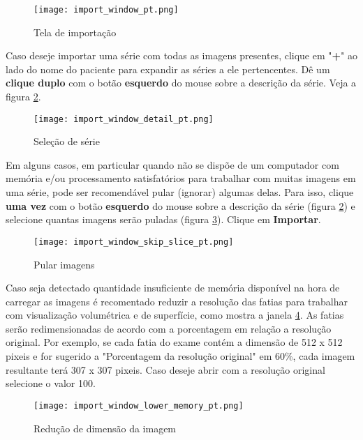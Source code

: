 \begin{figure}[!htb]
\centering
\texttt{[image: import\_window\_pt.png]}
\caption{Tela de importação}
\label{fig:win_import}
\end{figure}

\newpage

Caso deseje importar uma série com todas as imagens presentes, clique em "\textbf{+}" ao
lado do nome do paciente para expandir as séries a ele pertencentes. Dê um \textbf{clique duplo}
com o botão \textbf{esquerdo} do mouse sobre a descrição da série. Veja a figura
\ref{fig:import_serie}.

\begin{figure}[!htb]
\centering
\texttt{[image: import\_window\_detail\_pt.png]}
\caption{Seleção de série}
\label{fig:import_serie}
\end{figure}
 

Em alguns casos, em particular quando não se dispõe de um computador com memória e/ou
processamento satisfatórios para trabalhar com muitas imagens em uma série, pode ser
recomendável pular (ignorar) algumas delas. Para isso, clique \textbf{uma vez} com o botão
\textbf{esquerdo} do mouse sobre a descrição da série (figura \ref{fig:import_serie}) e selecione
quantas imagens serão puladas (figura \ref{fig:skip_image}). Clique em \textbf{Importar}.

\begin{figure}[!htb]
\centering
\texttt{[image: import\_window\_skip\_slice\_pt.png]}
\caption{Pular imagens}
\label{fig:skip_image}
\end{figure}


Caso seja detectado quantidade insuficiente de memória disponível na hora de carregar as imagens é recomentado 
reduzir a resolução das fatias para trabalhar com visualização volumétrica e de superfície, como mostra a janela \ref{fig:resize_image}. 
As fatias serão redimensionadas de acordo com a porcentagem em relação a resolução original. Por exemplo, 
se cada fatia do exame contém a dimensão de 512 x 512 pixeis e for sugerido a "Porcentagem da resolução original" em 60\%, 
cada imagem resultante terá 307 x 307 pixeis. Caso deseje abrir com a resolução original selecione o valor 100.

\begin{figure}[!htb]
\centering
\texttt{[image: import\_window\_lower\_memory\_pt.png]}
\caption{Redução de dimensão da imagem}
\label{fig:resize_image}
\end{figure}

